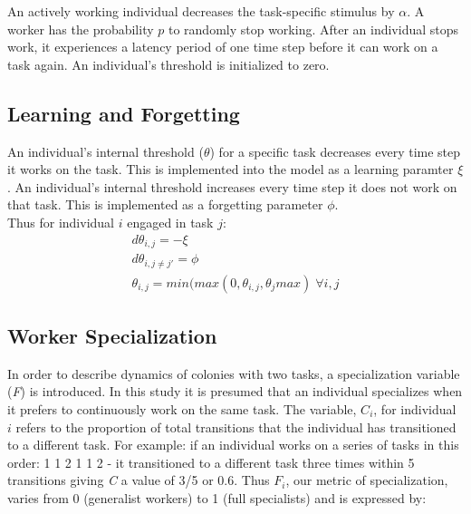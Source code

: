 \documentclass[a4paper]{article}
\begin{document}
An actively working individual decreases the task-specific stimulus by $\alpha$.  A worker has the probability $p$ to randomly stop working. After an individual stops work, it experiences a latency period of one time step before it can work on a task again. An individual's threshold is initialized to zero.

\subsection{Learning and Forgetting}

An individual's internal threshold ($\theta$) for a specific task decreases every time step it works on the task. This is implemented into the model as a learning paramter $\xi$.  An individual's internal threshold increases every time step it does not work on that task. This is implemented as a forgetting parameter $\phi$. \\ 


Thus for individual $i$ engaged in task $j$:
\begin{subequations}
\begin{gather}
d\theta_{i,j} = - \xi \\
d\theta_{i,j\neq j'} = \phi \\
\theta_{i,j} = min(max(0,\theta_{i,j},\theta_j max) \; \forall i,j
\end{gather}
\end{subequations}


 
\subsection{Worker Specialization}

In order to describe dynamics of colonies with two tasks, a specialization variable (\textit{F}) is introduced. In this study it is presumed that an individual specializes when it prefers to continuously work on the same task. The variable, $C_i$, for individual $i$ refers to the proportion of total transitions that the individual has transitioned to a different task. For example: if an individual works on a series of tasks in this order: 1 1 2 1 1 2 - it transitioned to a different task three times within 5 transitions giving \textit{C} a value of 3/5 or 0.6. Thus  $F_i$, our metric of specialization,  varies from 0 (generalist workers) to 1 (full specialists) and is expressed by:

\end{document}
